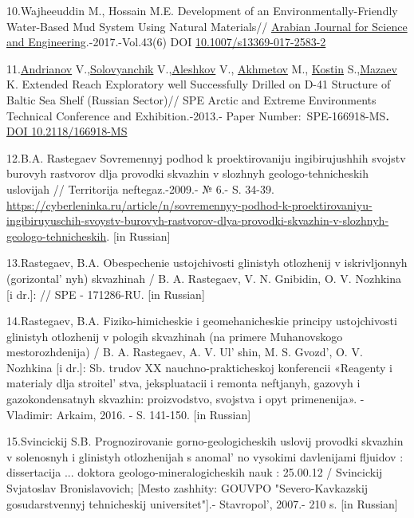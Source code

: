 \begin{noparindent}
10.Wajheeuddin M., Hossain M.E. Development of an
Environmentally-Friendly Water-Based Mud System Using Natural
Materials//
\href{https://www.researchgate.net/journal/Arabian-Journal-for-Science-and-Engineering-2191-4281?_tp=eyJjb250ZXh0Ijp7ImZpcnN0UGFnZSI6InB1YmxpY2F0aW9uIiwicGFnZSI6InB1YmxpY2F0aW9uIn19}{Arabian
Journal for Science and Engineering}.-2017.-Vol.43(6) DOI
\href{https://doi.org/10.1007/s13369-017-2583-2}{10.1007/s13369-017-2583-2}

11.\href{javascript:;}{Andrianov} V.,\href{javascript:;}{Solovyanchik}
V.,\href{javascript:;}{Aleshkov} V., \href{javascript:;}{Akhmetov} M.,
\href{javascript:;}{Kostin} S.,\href{javascript:;}{Mazaev} K. Extended
Reach Exploratory well Successfully Drilled on D-41 Structure of Baltic
Sea Shelf (Russian Sector)// SPE Arctic and Extreme Environments
Technical Conference and Exhibition.-2013.- Paper
Number:~SPE-166918-MS{\bfseries .}
\href{https://doi.org/10.2118/166918-MS}{DOI 10.2118/166918-MS}

12.B.A. Rastegaev Sovremennyj podhod k proektirovaniju ingibirujushhih
svojstv burovyh rastvorov dlja provodki skvazhin v slozhnyh
geologo-tehnicheskih uslovijah // Territorija neftegaz.-2009.- № 6.- S.
34-39.
\url{https://cyberleninka.ru/article/n/sovremennyy-podhod-k-proektirovaniyu-ingibiruyuschih-svoystv-burovyh-rastvorov-dlya-provodki-skvazhin-v-slozhnyh-geologo-tehnicheskih}.
{[}in Russian{]}

13.Rastegaev, B.A. Obespechenie ustojchivosti glinistyh otlozhenij v
iskrivljonnyh (gorizontal' nyh) skvazhinah / B. A.
Rastegaev, V. N. Gnibidin, O. V. Nozhkina {[}i dr.{]}: // SPE -
171286-RU. {[}in Russian{]}

14.Rastegaev, B.A. Fiziko-himicheskie i geomehanicheskie principy
ustojchivosti glinistyh otlozhenij v pologih skvazhinah (na primere
Muhanovskogo mestorozhdenija) / B. A. Rastegaev, A. V.
Ul' shin, M. S. Gvozd', O. V. Nozhkina
{[}i dr.{]}: Sb. trudov XX nauchno-prakticheskoj konferencii «Reagenty i
materialy dlja stroitel' stva, jekspluatacii i remonta
neftjanyh, gazovyh i gazokondensatnyh skvazhin: proizvodstvo, svojstva i
opyt primenenija». - Vladimir: Arkaim, 2016. - S. 141-150. {[}in
Russian{]}

15.Svincickij S.B. Prognozirovanie gorno-geologicheskih uslovij provodki
skvazhin v solenosnyh i glinistyh otlozhenijah s
anomal' no vysokimi davlenijami fljuidov : dissertacija
... doktora geologo-mineralogicheskih nauk : 25.00.12 / Svincickij
Svjatoslav Bronislavovich; {[}Mesto zashhity: GOUVPO "Severo-Kavkazskij
gosudarstvennyj tehnicheskij universitet"{]}.-
Stavropol', 2007.- 210 s. {[}in Russian{]}


\end{noparindent}
